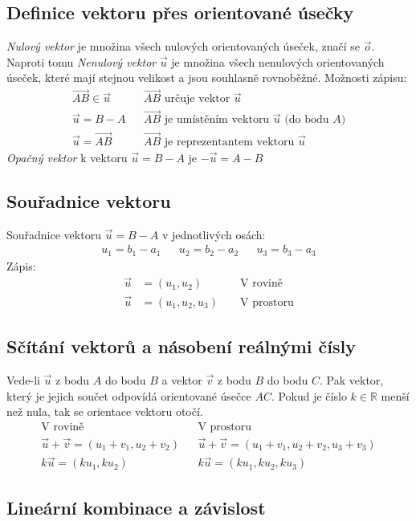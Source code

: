 \documentclass[12pt]{article}
\begin{document}
\subsection{Definice vektoru přes orientované úsečky}
\emph{Nulový vektor} je množina všech  nulových orientovaných úseček, značí se $\vec{o}$. Naproti tomu \emph{Nenulový vektor} $\vec{u}$ je množina všech nenulových orientovaných úseček, které mají stejnou velikost a jsou souhlasně rovnoběžné. Možnosti zápisu:
\begin{align}
\overrightarrow{AB} \in \vec{u} && \text{$\overrightarrow{AB}$ určuje vektor $\vec{u}$}\\
\vec{u} = B - A &&\text{$\overrightarrow{AB}$ je umístěním vektoru  $\vec{u}$ (do bodu $A$)}\\
\vec{u} = \overrightarrow{AB} && \text{$\overrightarrow{AB}$ je reprezentantem vektoru $\vec{u}$}
\end{align}
\emph{Opačný vektor} k vektoru $\vec{u} = B - A $ je $- \vec{u} = A-B$
\subsection{Souřadnice vektoru}
Souřadnice vektoru $\vec{u} = B-A$ v jednotlivých osách:
\begin{align}
u_1 = b_1 -a_1 && u_2 = b_2 - a_2 && u_3 = b_3 - a_3
\end{align}
Zápis:
\begin{align}
\vec{u} &= \left(u_1, u_2 \right) && \text{ V rovině}\\
\vec{u} &= \left(u_1, u_2, u_3 \right) && \text{ V prostoru}
\end{align}
\subsection{Sčítání vektorů a násobení reálnými čísly}
Vede-li $\vec{u}$ z bodu $A$ do bodu $B$ a vektor $\vec{v}$ z bodu $B$ do bodu $C$. Pak vektor, který je jejich součet odpovídá orientované úsečce $AC$. Pokud je číslo $k \in \mathbb{R}$  menší než nula, tak se orientace vektoru otočí.
\begin{align}
\text{V rovině} && \text{V prostoru}\\
\vec{u} + \vec{v} = \left( u_1 + v_1, u_2 +v_2\right) && \vec{u} + \vec{v} = \left( u_1 + v_1, u_2 +v_2, u_3 + v_3 \right)\\
k \vec{u} = (ku_1, ku_2) && k \vec{u} = (ku_1, ku_2, ku_3)
\end{align}
\subsection{Lineární kombinace a závislost}
\end{document}
